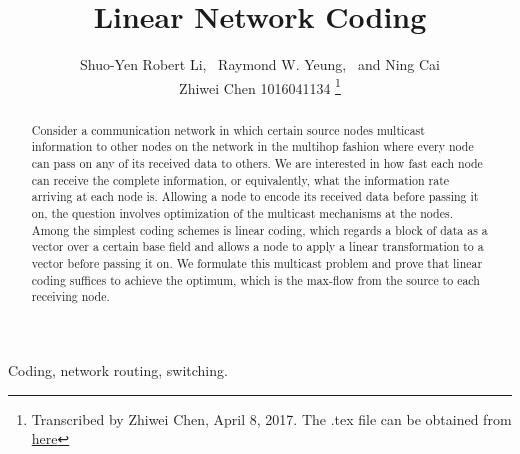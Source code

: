 \documentclass[journal]{IEEEtran}
\begin{document}
\title{Linear Network Coding}
	\author{Shuo-Yen Robert Li,\  Raymond W. Yeung,\  and Ning Cai\\
	Zhiwei Chen 1016041134
	\thanks{Transcribed by Zhiwei Chen, April 8, 2017. The .tex file can be obtained from \href{https://github.com/Lethe-cc/latex}{here}}}
\maketitle
	
	\begin{abstract}
		Consider a communication network in which certain source nodes multicast information to other nodes on the network in the multihop fashion where every node can pass on any of its received data to others. We are interested in how fast each node can receive the complete information, or equivalently, what the information rate arriving at each node is. Allowing a node to encode its received data before passing it on, the question involves optimization of the multicast mechanisms at the nodes. Among the simplest coding schemes is linear coding, which regards a block of data as a vector over a certain base field and allows a node to apply a linear transformation to a vector before passing it on. We formulate this multicast problem and prove that linear coding suffices to achieve the optimum, which is the max-flow from the source to each receiving node.
	\end{abstract}
	
	\begin{IEEEkeywords}
			Coding, network routing, switching.
\end{IEEEkeywords}
\IEEEpeerreviewmaketitle
\end{document}
